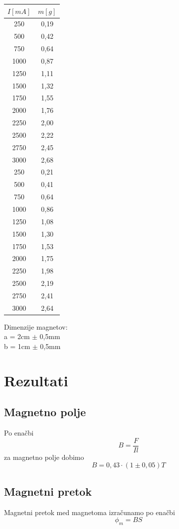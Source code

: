 \documentclass[a4paper]{report}
\begin{document}
\begin{center}
\begin{tabular}{ |c|c| } 
 \hline
 $I[mA]$ & $m[g]$\\
 \hline \hline 
 250 & 0,19\\
 500 & 0,42\\
 750 & 0,64\\
 1000 & 0,87\\
 1250 & 1,11\\
 1500 & 1,32\\
 1750 & 1,55\\
 2000 & 1,76\\
 2250 & 2,00\\
 2500 & 2,22\\
 2750 & 2,45\\
 3000 & 2,68\\
 \hline
 250   & 0,21 \\
 500   & 0,41 \\
    750   & 0,64 \\
    1000  & 0,86 \\
    1250  & 1,08 \\
    1500  & 1,30 \\
    1750  & 1,53 \\
    2000  & 1,75 \\
    2250  & 1,98 \\
    2500  & 2,19 \\
    2750  & 2,41 \\
    3000  & 2,64 \\
 \hline
\end{tabular}
\end{center}

\noindent Dimenzije magnetov:\\
a = 2cm $\pm$ 0,5mm\\
b = 1cm $\pm$ 0,5mm

\chapter*{Rezultati}
\section*{Magnetno polje}
Po enačbi
\[B=\frac{F}{Il}\]
za magnetno polje dobimo 
\[B=0,43 \cdot(1 \pm 0,05) T\]


\section*{Magnetni pretok}
Magnetni pretok med magnetoma izračunamo po enačbi 
\[\phi_m = BS\]
\end{document}
